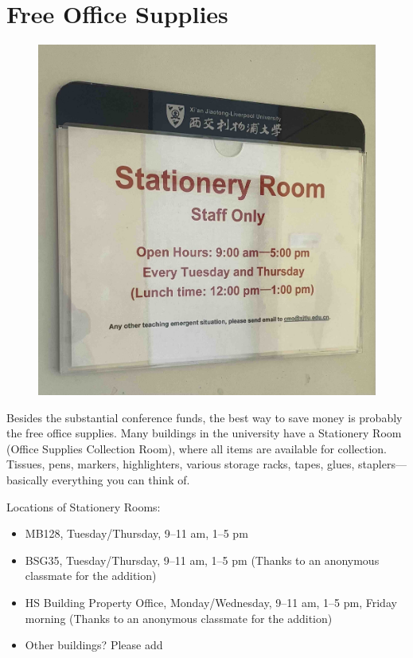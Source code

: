 \section{Free Office Supplies}
\begin{figure}[H]
    \centering
    \includegraphics[width=0.6\columnwidth]{author-folder/Kai.Wu/stationery_room.jpg}
\end{figure}

Besides the substantial conference funds, the best way to save money is probably the free office supplies. Many buildings in the university have a Stationery Room (Office Supplies Collection Room), where all items are available for collection. Tissues, pens, markers, highlighters, various storage racks, tapes, glues, staplers—basically everything you can think of.

\vspace{5mm}
Locations of Stationery Rooms:
\begin{itemize}
    \item MB128, Tuesday/Thursday, 9–11 am, 1–5 pm
    \item BSG35, Tuesday/Thursday, 9–11 am, 1–5 pm (Thanks to an anonymous classmate for the addition)
    \item HS Building Property Office, Monday/Wednesday, 9–11 am, 1–5 pm, Friday morning (Thanks to an anonymous classmate for the addition)
    \item Other buildings? Please add
\end{itemize}

